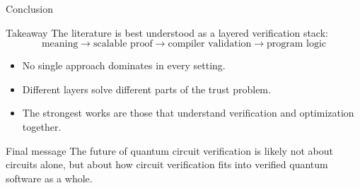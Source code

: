 \documentclass[aspectratio=169]{beamer}
\begin{document}
\begin{frame}{Conclusion}
\justifying
\begin{block}{Takeaway}
The literature is best understood as a layered verification stack:
\[
\text{meaning} \rightarrow \text{scalable proof} \rightarrow \text{compiler validation} \rightarrow \text{program logic}
\]
\end{block}

\pause

\begin{itemize}
    \item No single approach dominates in every setting.
    \item Different layers solve different parts of the trust problem.
    \item The strongest works are those that understand verification and optimization together.
\end{itemize}

\pause

\begin{alertblock}{Final message}
The future of quantum circuit verification is likely not about circuits alone, but about how circuit verification fits into verified quantum software as a whole.
\end{alertblock}
\end{frame}
\end{document}
